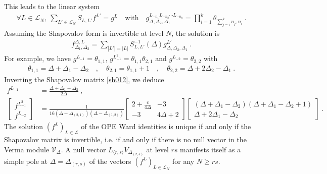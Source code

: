 \documentclass[12pt, a4paper]{article}
\theoremstyle{break}
\begin{document}
This leads to the linear system 
\begin{align}
 \forall L\in \mathcal{L}_N, \ \sum_{L'\in\mathcal{L}_N} S_{L,L'} f^{L'} = g^L \quad \text{with} \quad 
 g^{L_{-n_1}L_{-n_2}\cdots L_{-n_k}}_{\Delta,\Delta_2,\Delta_1} = \prod_{i=1}^k \theta_{\sum_{j=i}^k n_j, n_i}
 \ .
 \label{sgl}
\end{align}
Assuming the Shapovalov form is invertible at level $N$, the solution is 
\begin{align}
 \boxed{f^{\Delta,L}_{\Delta_1,\Delta_2} = \sum_{|L'|=|L|} S_{L,L'}^{-1}(\Delta) g^{L'}_{\Delta,\Delta_2,\Delta_1}}\ .
 \label{fsg}
\end{align}
For example, we have $g^{L_{-1}} = \theta_{1,1}$, $g^{L_{-1}^2} = \theta_{1,1}\theta_{2,1}$ and $g^{L_{-2}}=\theta_{2,2}$ with 
\begin{align}
 \theta_{1,1} = \Delta+\Delta_1-\Delta_2 \quad , \quad \theta_{2,1} = \theta_{1,1}+1 \quad , \quad \theta_{2,2} = \Delta+2\Delta_2-\Delta_1 \ .
\end{align}
Inverting the Shapovalov matrix \eqref{sh012}, we deduce
\begin{subequations}
 \label{fl12}
 \begin{align}
  f^{L_{-1}} & = \frac{\Delta+\Delta_1-\Delta_2}{2\Delta}\ ,
  \label{fl1}
  \\
  \left[\begin{smallmatrix}
 f^{L_{-1}^2} \\ f^{L_{-2}} 
 \end{smallmatrix}\right] 
 & =
   \frac{1}{16(\Delta-\Delta_{(2,1)})(\Delta-\Delta_{(1,2)})}
\left[\begin{smallmatrix} 2+\frac{c}{4\Delta} & -3 \\ -3 & 4\Delta+2 \end{smallmatrix}\right]
\left[\begin{smallmatrix} (\Delta+\Delta_1-\Delta_2)(\Delta+\Delta_1-\Delta_2+1) \\ \Delta+2\Delta_1-\Delta_2 \end{smallmatrix}\right] \ .
 \end{align}
\end{subequations}
The solution $\left(f^L\right)_{L\in\mathcal{L}}$ of the OPE Ward identities is unique if and only if the Shapovalov matrix is invertible, i.e. if and only if there is no null vector in the Verma module $\mathcal{V}_\Delta$. A null vector $L_{\langle r,s\rangle} V_{\Delta_{(r,s)}}$ at level $rs$ manifests itself as a simple pole at $\Delta=\Delta_{(r,s)}$ of the vectors $(f^L)_{L\in\mathcal{L}_N}$ for any $N\geq rs$.
\end{document}
